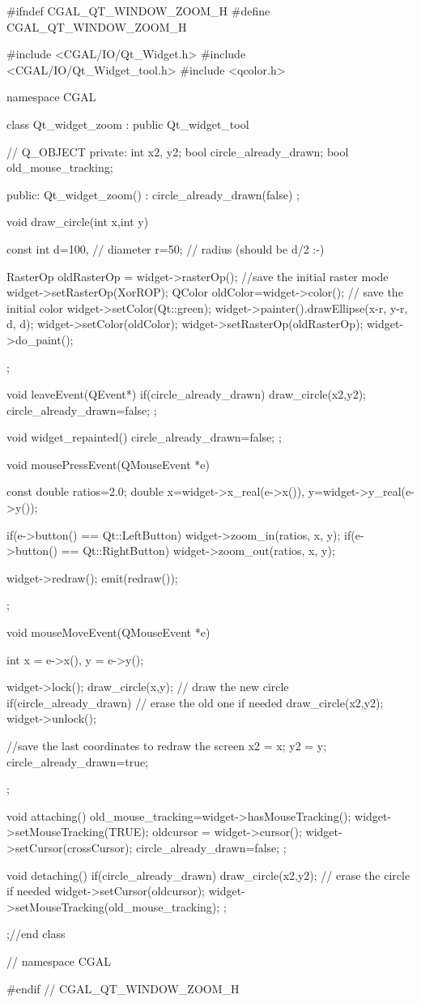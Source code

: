 \begin{ccExampleCode}
#ifndef CGAL_QT_WINDOW_ZOOM_H
#define CGAL_QT_WINDOW_ZOOM_H

#include <CGAL/IO/Qt_Widget.h>
#include <CGAL/IO/Qt_Widget_tool.h>
#include <qcolor.h>

namespace CGAL {

class Qt_widget_zoom : public Qt_widget_tool
{
  //  Q_OBJECT
private:
	int									    x2, y2;
	bool circle_already_drawn;
	bool old_mouse_tracking;

public:
  Qt_widget_zoom() : circle_already_drawn(false) {};

  void draw_circle(int x,int y)
  {
    const int
    d=100, // diameter
    r=50;  // radius (should be d/2 :-)

    RasterOp oldRasterOp = widget->rasterOp();	//save the initial raster mode
    widget->setRasterOp(XorROP);
    QColor oldColor=widget->color(); // save the initial color
    widget->setColor(Qt::green);
    widget->painter().drawEllipse(x-r, y-r, d, d);
    widget->setColor(oldColor);
    widget->setRasterOp(oldRasterOp);
    widget->do_paint();
  };

  void leaveEvent(QEvent*)
  {
    if(circle_already_drawn)
      draw_circle(x2,y2);
    circle_already_drawn=false;
  };

  void widget_repainted(){
    circle_already_drawn=false;
  };

  void mousePressEvent(QMouseEvent *e)
  {
    const double ratios=2.0;
    double
      x=widget->x_real(e->x()),
      y=widget->y_real(e->y());
		
    if(e->button() == Qt::LeftButton)
      widget->zoom_in(ratios, x, y);
    if(e->button() == Qt::RightButton)
      widget->zoom_out(ratios, x, y);
		
    widget->redraw();
    emit(redraw()); 
  };

  void mouseMoveEvent(QMouseEvent *e)
  {
    int
      x = e->x(),
      y = e->y();

    widget->lock();
    draw_circle(x,y); // draw the new circle
    if(circle_already_drawn) // erase the old one if needed
        draw_circle(x2,y2);
    widget->unlock();
		
    //save the last coordinates to redraw the screen
    x2 = x;
    y2 = y;
    circle_already_drawn=true;
  };

  void attaching()
  {
    old_mouse_tracking=widget->hasMouseTracking();
    widget->setMouseTracking(TRUE);
    oldcursor = widget->cursor();
    widget->setCursor(crossCursor);
    circle_already_drawn=false;
  };

  void detaching()
  {
    if(circle_already_drawn)
      draw_circle(x2,y2); // erase the circle if needed
    widget->setCursor(oldcursor);
    widget->setMouseTracking(old_mouse_tracking);
  };
};//end class 

} // namespace CGAL

#endif // CGAL_QT_WINDOW_ZOOM_H
\end{ccExampleCode}

